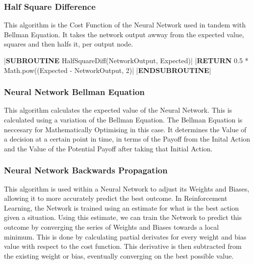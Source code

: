 \begin{flushleft}
                \vspace{0.5cm}
            \subsubsection{Half Square Difference}  
                This algorithm is the Cost Function of the Neural Network used in tandem with Bellman Equation. It takes the network output
                awway from the expected value, squares and then halfs it, per output node.

                \begin{pseudocode}
|\textbf{SUBROUTINE} HalfSquareDiff(NetworkOutput, Expected)|  
    |\textbf{RETURN} 0.5 * Math.pow((Expected - NetworkOutput, 2)|
|\textbf{ENDSUBROUTINE}|
                \end{pseudocode}
            \subsubsection{Neural Network Bellman Equation}
                This algorithm calculates the expected value of the Neural Network. This is calculated using a variation of the Bellman Equation.
                The Bellman Equation is neccesary for Mathematically Optimising in this case. It determines the Value of a decision at a certain 
                point in time, in terms of the Payoff from the Inital Action and the Value of the Potential Payoff after taking that Initial
                Action. 
                
                \vspace{0.2cm}
                \begin{pseudocode}

                \end{pseudocode}

                \vspace{0.5cm}
            \subsubsection{Neural Network Backwards Propagation}
                This algorithm is used within a Neural Network to adjust its Weights and Biases, allowing it to more accurately predict the
                best outcome. In Reinforcement Learning, the Network is trained using an estimate for what is the best action given a situation.
                Using this estimate, we can train the Network to predict this outcome by converging the series of Weights and Biases towards a
                local minimum. This is done by calculating partial derivates for every weight and bias value with respect to the cost function.
                This derivative is then subtracted from the existing weight or bias, eventually converging on the best possible value.


\end{flushleft}
